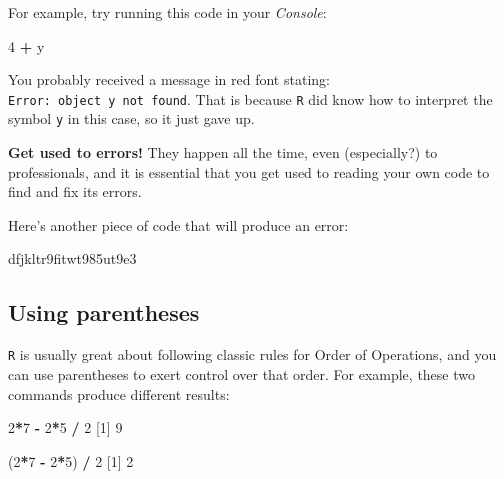 \documentclass[]{book}
\newenvironment{Shaded}{\begin{snugshade}}{\end{snugshade}}
\newcommand{\DecValTok}[1]{\textcolor[rgb]{0.00,0.00,0.81}{#1}}
\newcommand{\NormalTok}[1]{#1}
\newcommand{\OperatorTok}[1]{\textcolor[rgb]{0.81,0.36,0.00}{\textbf{#1}}}
\newcommand{\StringTok}[1]{\textcolor[rgb]{0.31,0.60,0.02}{#1}}
\begin{document}
For example, try running this code in your \emph{Console}:

\begin{Shaded}
\begin{Highlighting}[]
\DecValTok{4} \OperatorTok{+}\StringTok{ }\NormalTok{y}
\end{Highlighting}
\end{Shaded}

You probably received a message in red font stating: \texttt{Error:\ object\ \textquotesingle{}y\textquotesingle{}\ not\ found}. That is because \texttt{R} did know how to interpret the symbol \texttt{y} in this case, so it just gave up.

\textbf{Get used to errors!} They happen all the time, even (especially?) to professionals, and it is essential that you get used to reading your own code to find and fix its errors.

Here's another piece of code that will produce an error:

\begin{Shaded}
\begin{Highlighting}[]
\NormalTok{dfjkltr9fitwt985ut9e3}
\end{Highlighting}
\end{Shaded}

\hypertarget{using-parentheses}{%
\subsection*{Using parentheses}\label{using-parentheses}}

\texttt{R} is usually great about following classic rules for Order of Operations, and you can use parentheses to exert control over that order. For example, these two commands produce different results:

\begin{Shaded}
\begin{Highlighting}[]
\DecValTok{2}\OperatorTok{*}\DecValTok{7} \OperatorTok{-}\StringTok{ }\DecValTok{2}\OperatorTok{*}\DecValTok{5} \OperatorTok{/}\StringTok{ }\DecValTok{2}
\NormalTok{[}\DecValTok{1}\NormalTok{] }\DecValTok{9}
\end{Highlighting}
\end{Shaded}

\begin{Shaded}
\begin{Highlighting}[]
\NormalTok{(}\DecValTok{2}\OperatorTok{*}\DecValTok{7} \OperatorTok{-}\StringTok{ }\DecValTok{2}\OperatorTok{*}\DecValTok{5}\NormalTok{) }\OperatorTok{/}\StringTok{ }\DecValTok{2}
\NormalTok{[}\DecValTok{1}\NormalTok{] }\DecValTok{2}
\end{Highlighting}
\end{Shaded}
\end{document}
